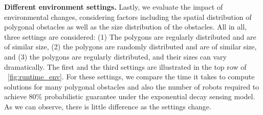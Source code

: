 \textbf{Different environment settings.}
Lastly, we evaluate the impact of environmental changes, considering factors including the spatial distribution of polygonal obstacles as well as 
the size distribution of the obstacles. 
%
All in all, three settings are considered: (1) The polygons are regularly distributed 
and are of similar size, (2) the polygons are randomly distributed and are of similar size,
and (3) the polygons are regularly distributed, and their sizes can vary dramatically. 
The first and the third settings are illustrated in the top row of ~\ref{fig:runtime_env}.
%
For these settings, we compare the time it takes to compute solutions for many polygonal
obstacles and also the number of robots required to achieve $80\%$ probabilistic guarantee 
under the exponential decay sensing model.
%
As we can observe, there is little difference as the settings change. 

